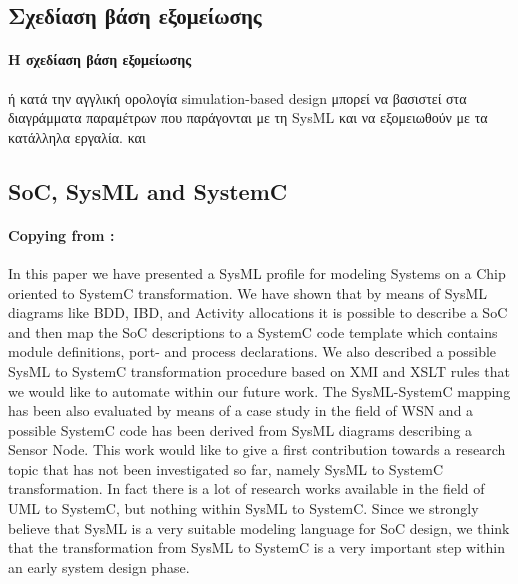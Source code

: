 \documentclass[a4paper,12pt,twoside]{report}
\begin{document}
{		\subsection{Σχεδίαση βάση εξομείωσης}
			\paragraph{Η σχεδίαση βάση εξομείωσης} {ή κατά την αγγλική ορολογία simulation-based design μπορεί να βασιστεί στα διαγράμματα παραμέτρων που παράγονται με τη SysML και να εξομειωθούν με τα κατάλληλα εργαλία. \cite{SimBasedDesignP1} και \cite{SimBasedDesignP2}
			}

		\subsection{SoC, SysML and SystemC}
			\paragraph{Copying from \cite{SoCSysMLSystemC} : } {In this paper we have presented a SysML profile for modeling Systems on a Chip oriented to SystemC transformation. We have shown that by means of SysML diagrams like BDD, IBD, and Activity allocations it is possible to describe a SoC and then map the SoC descriptions to a SystemC code template which contains module definitions, port- and process declarations. We also described a possible SysML to SystemC transformation procedure based on XMI and XSLT rules that we would like to automate within our future work. The SysML-SystemC mapping has been also evaluated by means of a case study in the field of WSN and a possible SystemC code has been derived from SysML diagrams describing a Sensor Node. This work would like to give a first contribution towards a research topic that has not been investigated so far, namely SysML to SystemC transformation. In fact there is a lot of research works available in the field of UML to SystemC, but nothing within SysML to SystemC. Since we strongly believe that SysML is a very suitable modeling language for SoC design, we think that the transformation from SysML to SystemC is a very important step within an early system design phase.
			}

}
\end{document}

